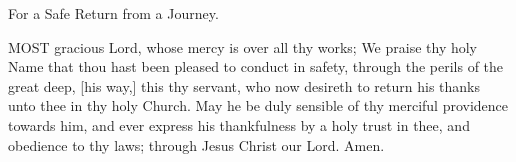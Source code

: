 For a Safe Return from a Journey.

MOST gracious Lord, whose mercy is over all thy works; We praise thy holy Name that thou hast been pleased to conduct in safety, through the perils of the great deep, [his way,] this thy servant, who now desireth to return his thanks unto thee in thy holy Church. May he be duly sensible of thy merciful providence towards him, and ever express his thankfulness by a holy trust in thee, and obedience to thy laws; through Jesus Christ our Lord. Amen.